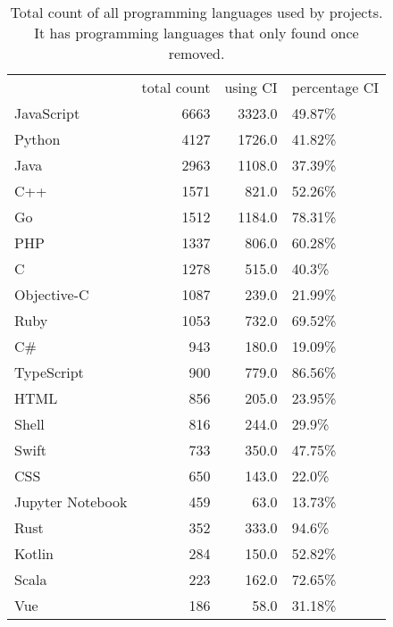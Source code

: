 \begin{table}
\centering
\caption{Total count of all programming languages used by projects. It has programming languages that only found once removed.}
\label{table:languages}
\begin{tabular}{lrrl}
\hline
{} &  total count &  using CI & percentage CI \\

JavaScript       &         6663 &    3323.0 &        49.87\% \\
Python           &         4127 &    1726.0 &        41.82\% \\
Java             &         2963 &    1108.0 &        37.39\% \\
C++              &         1571 &     821.0 &        52.26\% \\
Go               &         1512 &    1184.0 &        78.31\% \\
PHP              &         1337 &     806.0 &        60.28\% \\
C                &         1278 &     515.0 &         40.3\% \\
Objective-C      &         1087 &     239.0 &        21.99\% \\
Ruby             &         1053 &     732.0 &        69.52\% \\
C\#               &          943 &     180.0 &        19.09\% \\
TypeScript       &          900 &     779.0 &        86.56\% \\
HTML             &          856 &     205.0 &        23.95\% \\
Shell            &          816 &     244.0 &         29.9\% \\
Swift            &          733 &     350.0 &        47.75\% \\
CSS              &          650 &     143.0 &         22.0\% \\
Jupyter Notebook &          459 &      63.0 &        13.73\% \\
Rust             &          352 &     333.0 &         94.6\% \\
Kotlin           &          284 &     150.0 &        52.82\% \\
Scala            &          223 &     162.0 &        72.65\% \\
Vue              &          186 &      58.0 &        31.18\% \\

\end{tabular}
\end{table}
